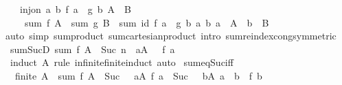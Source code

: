 \begin{isabellebody}
\ \ \ {\isachardoublequoteopen}inj{\isacharunderscore}{\kern0pt}on\ {\isacharparenleft}{\kern0pt}{\isasymlambda}{\isacharparenleft}{\kern0pt}a{\isacharcomma}{\kern0pt}\ b{\isacharparenright}{\kern0pt}{\isachardot}{\kern0pt}\ f\ a\ {\isacharasterisk}{\kern0pt}\ g\ b{\isacharparenright}{\kern0pt}\ {\isacharparenleft}{\kern0pt}A\ {\isasymtimes}\ B{\isacharparenright}{\kern0pt}\ {\isasymLongrightarrow}\isanewline
\ \ \ \ sum\ f\ A\ {\isacharasterisk}{\kern0pt}\ sum\ g\ B\ {\isacharequal}{\kern0pt}\ sum\ id\ {\isacharbraceleft}{\kern0pt}f\ a\ {\isacharasterisk}{\kern0pt}\ g\ b\ {\isacharbar}{\kern0pt}a\ b{\isachardot}{\kern0pt}\ a\ {\isasymin}\ A\ {\isasymand}\ b\ {\isasymin}\ B{\isacharbraceright}{\kern0pt}{\isachardoublequoteclose}\isanewline
%
\isadelimproof
\ \ %
\endisadelimproof
%
\isatagproof
{}\isamarkupfalse%
{\isacharparenleft}{\kern0pt}auto\ simp{\isacharcolon}{\kern0pt}\ sum{\isacharunderscore}{\kern0pt}product\ sum{\isachardot}{\kern0pt}cartesian{\isacharunderscore}{\kern0pt}product\ intro{\isacharbang}{\kern0pt}{\isacharcolon}{\kern0pt}\ sum{\isachardot}{\kern0pt}reindex{\isacharunderscore}{\kern0pt}cong{\isacharbrackleft}{\kern0pt}symmetric{\isacharbrackright}{\kern0pt}{\isacharparenright}{\kern0pt}%
\endisatagproof
{\isafoldproof}%
%
\isadelimproof
\isanewline
%
\endisadelimproof
\isanewline
{}\isamarkupfalse%
\ sum{\isacharunderscore}{\kern0pt}SucD{\isacharcolon}{\kern0pt}\ {\isachardoublequoteopen}sum\ f\ A\ {\isacharequal}{\kern0pt}\ Suc\ n\ {\isasymLongrightarrow}\ {\isasymexists}a{\isasymin}A{\isachardot}{\kern0pt}\ {}\ {\isacharless}{\kern0pt}\ f\ a{\isachardoublequoteclose}\isanewline
%
\isadelimproof
\ \ %
\endisadelimproof
%
\isatagproof
{}\isamarkupfalse%
\ {\isacharparenleft}{\kern0pt}induct\ A\ rule{\isacharcolon}{\kern0pt}\ infinite{\isacharunderscore}{\kern0pt}finite{\isacharunderscore}{\kern0pt}induct{\isacharparenright}{\kern0pt}\ auto%
\endisatagproof
{\isafoldproof}%
%
\isadelimproof
\isanewline
%
\endisadelimproof
\isanewline
{}\isamarkupfalse%
\ sum{\isacharunderscore}{\kern0pt}eq{\isacharunderscore}{\kern0pt}Suc{}{\isacharunderscore}{\kern0pt}iff{\isacharcolon}{\kern0pt}\isanewline
\ \ {\isachardoublequoteopen}finite\ A\ {\isasymLongrightarrow}\ sum\ f\ A\ {\isacharequal}{\kern0pt}\ Suc\ {}\ {\isasymlongleftrightarrow}\ {\isacharparenleft}{\kern0pt}{\isasymexists}a{\isasymin}A{\isachardot}{\kern0pt}\ f\ a\ {\isacharequal}{\kern0pt}\ Suc\ {}\ {\isasymand}\ {\isacharparenleft}{\kern0pt}{\isasymforall}b{\isasymin}A{\isachardot}{\kern0pt}\ a\ {\isasymnoteq}\ b\ {\isasymlongrightarrow}\ f\ b\ {\isacharequal}{\kern0pt}\ {}{\isacharparenright}{\kern0pt}{\isacharparenright}{\kern0pt}{\isachardoublequoteclose}\isanewline

\end{isabellebody}

